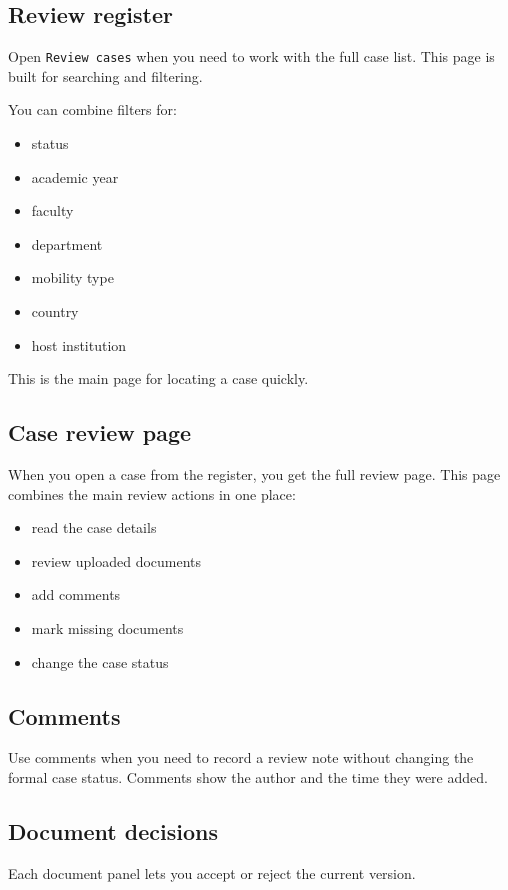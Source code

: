 \documentclass[11pt,a4paper]{article}
\begin{document}
\subsection*{Review register}
Open \texttt{Review cases} when you need to work with the full case list. This page is built for searching and filtering.

You can combine filters for:

\begin{itemize}
  \item status
  \item academic year
  \item faculty
  \item department
  \item mobility type
  \item country
  \item host institution
\end{itemize}

This is the main page for locating a case quickly.

\subsection*{Case review page}
When you open a case from the register, you get the full review page. This page combines the main review actions in one place:

\begin{itemize}
  \item read the case details
  \item review uploaded documents
  \item add comments
  \item mark missing documents
  \item change the case status
\end{itemize}

\subsection*{Comments}
Use comments when you need to record a review note without changing the formal case status. Comments show the author and the time they were added.

\subsection*{Document decisions}
Each document panel lets you accept or reject the current version.
\end{document}
